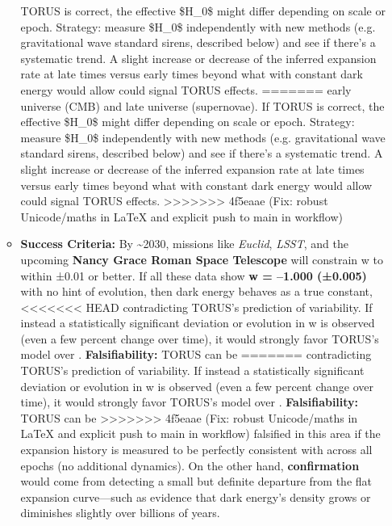 \documentclass[]{article}
\begin{document}
\begin{itemize}
\begin{itemize}
    TORUS is correct, the effective \$H\_0\$ might differ depending on
    scale or epoch. Strategy: measure \$H\_0\$ independently with new
    methods (e.g. gravitational wave standard sirens, described below)
    and see if there's a systematic trend. A slight increase or decrease
    of the inferred expansion rate at late times versus early times
    beyond what \LambdaCDM with constant dark energy would allow could signal
    TORUS effects\hspace{0pt}.
=======
    early universe (CMB) and late universe (supernovae)​. If TORUS is
    correct, the effective \$H\_0\$ might differ depending on scale or
    epoch. Strategy: measure \$H\_0\$ independently with new methods
    (e.g. gravitational wave standard sirens, described below) and see
    if there's a systematic trend. A slight increase or decrease of the
    inferred expansion rate at late times versus early times beyond what
    \LambdaCDM with constant dark energy would allow could signal TORUS
    effects​.
>>>>>>> 4f5eaae (Fix: robust Unicode/maths in LaTeX and explicit push to main in workflow)
  \item
    \textbf{Success Criteria:} By \textasciitilde{}2030, missions like
    \emph{Euclid}, \emph{LSST}, and the upcoming \textbf{Nancy Grace
    Roman Space Telescope} will constrain w to within ±0.01 or better.
    If all these data show \textbf{w = --1.000 (±0.005)} with no hint of
    evolution, then dark energy behaves as a true constant,
<<<<<<< HEAD
    contradicting TORUS's prediction of variability\hspace{0pt}. If
    instead a statistically significant deviation or evolution in w is
    observed (even a few percent change over time), it would strongly
    favor TORUS's model over \LambdaCDM. \textbf{Falsifiability:} TORUS can be
=======
    contradicting TORUS's prediction of variability​. If instead a
    statistically significant deviation or evolution in w is observed
    (even a few percent change over time), it would strongly favor
    TORUS's model over \LambdaCDM. \textbf{Falsifiability:} TORUS can be
>>>>>>> 4f5eaae (Fix: robust Unicode/maths in LaTeX and explicit push to main in workflow)
    falsified in this area if the expansion history is measured to be
    perfectly consistent with \LambdaCDM across all epochs (no additional
    dynamics). On the other hand, \textbf{confirmation} would come from
    detecting a small but definite departure from the flat \LambdaCDM
    expansion curve---such as evidence that dark energy's density grows
    or diminishes slightly over billions of years.

\end{itemize}
\end{itemize}
\end{document}
